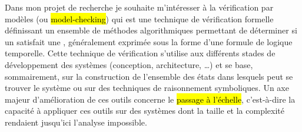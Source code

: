 \label{sec:projet_recherche}
\vspace{10pt}




Dans mon projet de recherche je souhaite m'intéresser à la vérification par
modèles (ou \hl{{model-checking}}) qui est une technique de vérification
formelle définissant un ensemble de méthodes algorithmiques permettant de
déterminer si un  satisfait une , généralement exprimée sous la forme d'une formule de logique
temporelle. Cette technique de vérification s'utilise aux différents stades de
développement des systèmes (conception, architecture, \dots) et se base,
sommairement, sur la construction de l'ensemble des états dans lesquels peut se
trouver le système ou sur des techniques de raisonnement symboliques. Un axe
majeur d'amélioration de ces outils concerne le \hl{passage à l'échelle},
c'est-à-dire la capacité à appliquer ces outils sur des systèmes dont la taille
et la complexité rendaient jusqu'ici l'analyse impossible.\\


